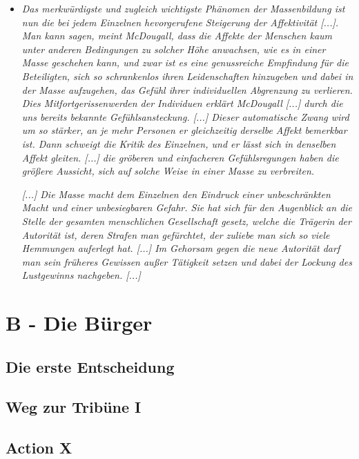 \documentclass[a4paper, 12pt]{report}
\begin{document}
\begin{itemize}
    \item[] \textit{Das merkwürdigste und zugleich wichtigste Phänomen der Massenbildung ist nun die bei jedem Einzelnen hevorgerufene Steigerung der Affektivität [...].
    Man kann sagen, meint McDougall, dass die Affekte der Menschen kaum unter anderen Bedingungen zu solcher Höhe anwachsen, wie es in einer Masse geschehen kann, und zwar ist es eine genussreiche Empfindung für die Beteiligten, sich so schrankenlos ihren Leidenschaften hinzugeben und dabei in der Masse aufzugehen, das Gefühl ihrer individuellen Abgrenzung zu verlieren.
    Dies Mitfortgerissenwerden der Individuen erklärt McDougall [...] durch die uns bereits bekannte Gefühlsansteckung. [...]
    Dieser automatische Zwang wird um so stärker, an je mehr Personen er gleichzeitig derselbe Affekt bemerkbar ist.
    Dann schweigt die Kritik des Einzelnen, und er lässt sich in denselben Affekt gleiten. [...]
    die gröberen und einfacheren Gefühlsregungen haben die größere Aussicht, sich auf solche Weise in einer Masse zu verbreiten.}

    \textit{[...] Die Masse macht dem Einzelnen den Eindruck einer unbeschränkten Macht und einer unbesiegbaren Gefahr.
    Sie hat sich für den Augenblick an die Stelle der gesamten menschlichen Gesellschaft gesetz, welche die Trägerin der Autorität ist, deren Strafen man gefürchtet, der zuliebe man sich so viele Hemmungen auferlegt hat.
    [...] Im Gehorsam gegen die neue Autorität darf man sein früheres \glqq Gewissen\grqq{} außer Tätigkeit setzen und dabei der Lockung des Lustgewinns nachgeben. [...]}
\end{itemize}
    

\section{B - Die Bürger}

\subsection{Die erste Entscheidung}

\subsection{Weg zur Tribüne I}

\subsection{Action X}
\end{document}
